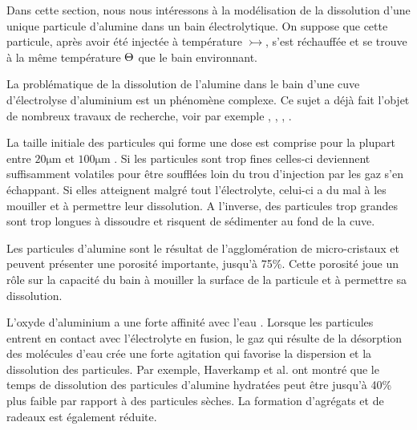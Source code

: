 Dans cette section, nous nous intéressons à la modélisation de la
dissolution d'une unique particule d'alumine dans un bain
électrolytique. On suppose que cette particule, après avoir été
injectée à température $\tinj$, s'est réchauffée et se trouve à la
même température $\Theta$ que le bain environnant.

La problématique de la dissolution de l'alumine dans le bain d'une
cuve d'électrolyse d'aluminium est un phénomène complexe. Ce sujet a
déjà fait l'objet de nombreux travaux de recherche, voir par exemple
\cite{Dassylva2015}, \cite{Kvande1986}, \cite{Gerlach1975},
\cite{Solheim1995}.

La taille initiale des particules qui forme une dose est comprise pour
la plupart entre $\num{20} \si{\micro\meter}$ et
$\num{100} \si{\micro\meter}$ \cite{Fini2017}. Si les particules sont
trop fines celles-ci deviennent suffisamment volatiles pour être
soufflées loin du trou d'injection par les gaz s'en échappant. Si
elles atteignent malgré tout l'électrolyte, celui-ci a du mal à les
mouiller et à permettre leur dissolution. A l'inverse, des particules
trop grandes sont trop longues à dissoudre et risquent de sédimenter
au fond de la cuve.

Les particules d'alumine sont le résultat de l'agglomération de
micro-cristaux et peuvent présenter une porosité importante, jusqu'à
\num{75}\%. Cette porosité joue un rôle sur la capacité du bain à
mouiller la surface de la particule et à permettre sa dissolution.

L'oxyde d'aluminium a une forte affinité avec l'eau
\cite{Patterson2001}. Lorsque les particules entrent en contact avec
l'électrolyte en fusion, le gaz qui résulte de la désorption des
molécules d'eau crée une forte agitation qui favorise la dispersion et
la dissolution des particules. Par exemple, Haverkamp et
al. \cite{Haverkamp1994} ont montré que le temps de dissolution des
particules d'alumine hydratées peut être jusqu'à \num{40}\% plus
faible par rapport à des particules sèches. La formation d'agrégats
et de radeaux est également réduite.

